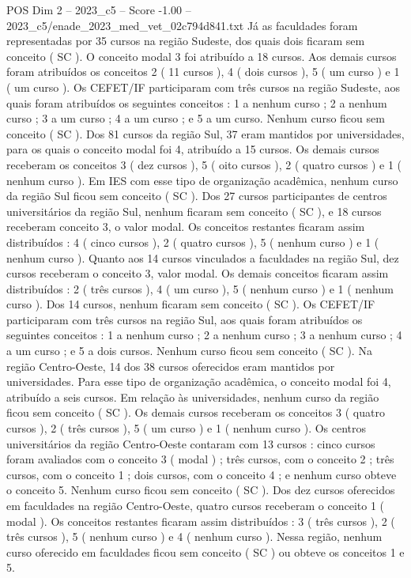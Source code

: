 \begin{textsample}{POS Dim 2 – 2023\_c5 – Score -1.00 – 2023\_c5/enade\_2023\_med\_vet\_02c794d841.txt}
Já as faculdades foram representadas por 35 cursos na região Sudeste, dos quais dois ficaram sem conceito ( SC ).
O conceito modal 3 foi atribuído a 18 cursos.
Aos demais cursos foram atribuídos os conceitos 2 ( 11 cursos ), 4 ( dois cursos ), 5 ( um curso ) e 1 ( um curso ).
Os CEFET/IF participaram com três cursos na região Sudeste, aos quais foram atribuídos os seguintes conceitos : 1 a nenhum curso ; 2 a nenhum curso ; 3 a um curso ; 4 a um curso ; e 5 a um curso.
Nenhum curso ficou sem conceito ( SC ).
Dos 81 cursos da região Sul, 37 eram mantidos por universidades, para os quais o conceito modal foi 4, atribuído a 15 cursos.
Os demais cursos receberam os conceitos 3 ( dez cursos ), 5 ( oito cursos ), 2 ( quatro cursos ) e 1 ( nenhum curso ).
Em IES com esse tipo de organização acadêmica, nenhum curso da região Sul ficou sem conceito ( SC ).
Dos 27 cursos participantes de centros universitários da região Sul, nenhum ficaram sem conceito ( SC ), e 18 cursos receberam conceito 3, o valor modal.
Os conceitos restantes ficaram assim distribuídos : 4 ( cinco cursos ), 2 ( quatro cursos ), 5 ( nenhum curso ) e 1 ( nenhum curso ).
Quanto aos 14 cursos vinculados a faculdades na região Sul, dez cursos receberam o conceito 3, valor modal.
Os demais conceitos ficaram assim distribuídos : 2 ( três cursos ), 4 ( um curso ), 5 ( nenhum curso ) e 1 ( nenhum curso ).
Dos 14 cursos, nenhum ficaram sem conceito ( SC ).
Os CEFET/IF participaram com três cursos na região Sul, aos quais foram atribuídos os seguintes conceitos : 1 a nenhum curso ; 2 a nenhum curso ; 3 a nenhum curso ; 4 a um curso ; e 5 a dois cursos.
Nenhum curso ficou sem conceito ( SC ).
Na região Centro-Oeste, 14 dos 38 cursos oferecidos eram mantidos por universidades.
Para esse tipo de organização acadêmica, o conceito modal foi 4, atribuído a seis cursos.
Em relação às universidades, nenhum curso da região ficou sem conceito ( SC ).
Os demais cursos receberam os conceitos 3 ( quatro cursos ), 2 ( três cursos ), 5 ( um curso ) e 1 ( nenhum curso ).
Os centros universitários da região Centro-Oeste contaram com 13 cursos : cinco cursos foram avaliados com o conceito 3 ( modal ) ; três cursos, com o conceito 2 ; três cursos, com o conceito 1 ; dois cursos, com o conceito 4 ; e nenhum curso obteve o conceito 5.
Nenhum curso ficou sem conceito ( SC ).
Dos dez cursos oferecidos em faculdades na região Centro-Oeste, quatro cursos receberam o conceito 1 ( modal ).
Os conceitos restantes ficaram assim distribuídos : 3 ( três cursos ), 2 ( três cursos ), 5 ( nenhum curso ) e 4 ( nenhum curso ).
Nessa região, nenhum curso oferecido em faculdades ficou sem conceito ( SC ) ou obteve os conceitos 1 e 5.

\end{textsample}
